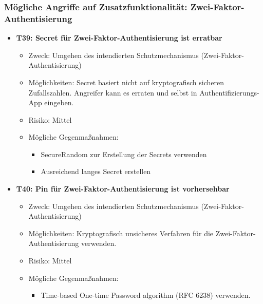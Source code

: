\documentclass[12pt,DIV14,BCOR10mm,a4paper,parskip=half-,headsepline,headinclude,english,ngerman,bibliography=totocnumbered]{scrreprt}
\begin{document}
\subsubsection{Mögliche Angriffe auf Zusatzfunktionalität: Zwei-Faktor-Authentisierung}
\begin{itemize}

  \hypertarget{threat39}{}
  \item \textbf{T39: Secret für Zwei-Faktor-Authentisierung ist erratbar}
  \begin{itemize}
    \item Zweck: Umgehen des intendierten Schutzmechanismus (Zwei-Faktor-Au\-then\-ti\-sier\-ung)
    \item Möglichkeiten: Secret basiert nicht auf kryptografisch sicheren Zufallszahlen. Angreifer kann es erraten und selbst in Authentifizierungs-App eingeben.
    \item Risiko: Mittel
    \item Mögliche Gegenmaßnahmen:
      \begin{itemize}
      \item SecureRandom zur Erstellung der Secrets verwenden
      \item Ausreichend langes Secret erstellen
      \end{itemize}
  \end{itemize}

  \hypertarget{threat40}{}
  \item \textbf{T40: Pin für Zwei-Faktor-Authentisierung ist vorhersehbar}
  \begin{itemize}
    \item Zweck: Umgehen des intendierten Schutzmechanismus (Zwei-Faktor-Au\-then\-ti\-sier\-ung)
    \item Möglichkeiten: Kryptografisch unsicheres Verfahren für die Zwei-Faktor-Au\-then\-ti\-sier\-ung verwenden.
    \item Risiko: Mittel
    \item Mögliche Gegenmaßnahmen:
      \begin{itemize}
      	\item Time-based One-time Password algorithm (RFC 6238) verwenden.
      \end{itemize}
  \end{itemize}


\end{itemize}
\end{document}
